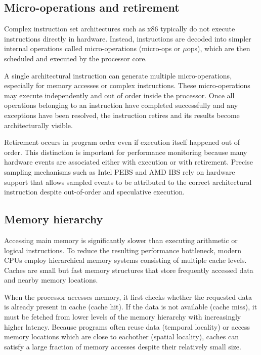 \subsection{Micro-operations and retirement}

Complex instruction set architectures such as x86 typically do not execute instructions directly in hardware. Instead, instructions are decoded into simpler internal operations called micro-operations (micro-ops or $\mu$ops), which are then scheduled and executed by the processor core.\cite[3.13]{Hennessy2011}\cite[2.3]{AMDOptimizationGuide}

A single architectural instruction can generate multiple micro-operations, especially for memory accesses or complex instructions. These micro-operations may execute independently and out of order inside the processor. Once all operations belonging to an instruction have completed successfully and any exceptions have been resolved, the instruction retires and its results become architecturally visible.

Retirement occurs in program order even if execution itself happened out of order. This distinction is important for performance monitoring because many hardware events are associated either with execution or with retirement. Precise sampling mechanisms such as Intel PEBS and AMD IBS rely on hardware support that allows sampled events to be attributed to the correct architectural instruction despite out-of-order and speculative execution.\cite[2.2.2.3]{IntelManual}

\subsection{Memory hierarchy}

Accessing main memory is significantly slower than executing arithmetic or logical instructions. To reduce the resulting performance bottleneck, modern CPUs employ hierarchical memory systems consisting of multiple cache levels\cite{HARRIS2022498}. Caches are small but fast memory structures that store frequently accessed data and nearby memory locations\cite{Hennessy2011}.

When the processor accesses memory, it first checks whether the requested data is already present in cache (cache hit). If the data is not available (cache miss), it must be fetched from lower levels of the memory hierarchy with increasingly higher latency\cite{Hennessy2011}. Because programs often reuse data (temporal locality) or access memory locations which are close to eachother (spatial locality)\cite{Denning2005,Weinberg}, caches can satisfy a large fraction of memory accesses despite their relatively small size.

